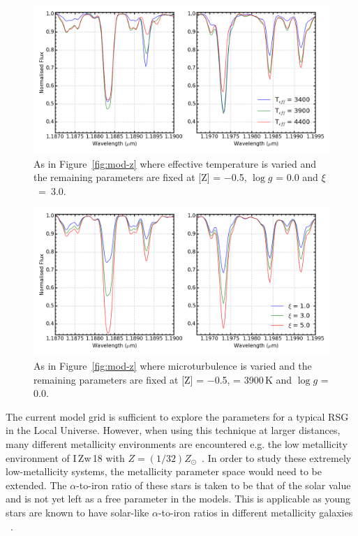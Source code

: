 \begin{figure}
 \centering
\includegraphics[width=\textwidth]{JAnal/varyTv2}
\caption[An example of the effect of effective temperature on the appearance of the model gird spectra]{
As in Figure~\ref{fig:mod-z} where effective temperature is varied and the remaining parameters are fixed at [Z] = $-$0.5, $\log g$ = 0.0 and $\xi$~=~3.0\kms.\label{fig:mod-t}
         }
\end{figure}
\begin{figure}
 \centering
\includegraphics[width=\textwidth]{JAnal/varymicrov2}
\caption[An example of the effect of microturbulence on the appearance of the model gird spectra]{
As in Figure~\ref{fig:mod-z} where microturbulence is varied and the remaining parameters are fixed at [Z] = $-$0.5, \Teff = 3900\,K and $\log g$ = 0.0.\label{fig:mod-micro}
         }
\end{figure}

The current model grid is sufficient to explore the parameters for a typical RSG in the Local Universe.
However, when using this technique at larger distances,
many different metallicity environments are encountered e.g. the low metallicity environment of I\,Zw\,18 with $Z=(1/32)Z_{\odot}$~\citep{1998ApJ...508..248V}.
In order to study these extremely low-metallicity systems,
the metallicity parameter space would need to be extended.
The $\alpha$-to-iron ratio of these stars is taken to be that of the solar value and is not yet left as a free parameter in the models.
This is applicable as young stars are known to have solar-like $\alpha$-to-iron ratios in different metallicity galaxies
~\citep[see tables 3 and 4 in][and references therein]{2015ApJ...806...21D}.

